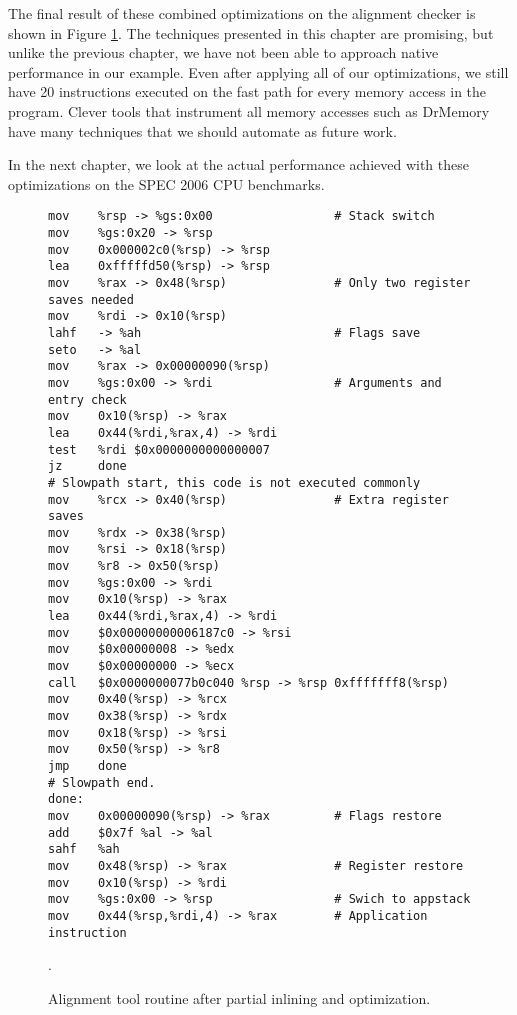 The final result of these combined optimizations on the alignment checker is
shown in Figure \ref{fig:alignment_all_opt}.  The techniques presented in this
chapter are promising, but unlike the previous chapter, we have not been able to
approach native performance in our example.  Even after applying all of our
optimizations, we still have 20 instructions executed on the fast path for every
memory access in the program.  Clever tools that instrument all memory accesses
such as DrMemory have many techniques that we should automate as future work.

In the next chapter, we look at the actual performance achieved with these
optimizations on the SPEC 2006 CPU benchmarks.

\begin{figure}
\begin{verbatim}
mov    %rsp -> %gs:0x00                 # Stack switch
mov    %gs:0x20 -> %rsp
mov    0x000002c0(%rsp) -> %rsp
lea    0xfffffd50(%rsp) -> %rsp
mov    %rax -> 0x48(%rsp)               # Only two register saves needed
mov    %rdi -> 0x10(%rsp)
lahf   -> %ah                           # Flags save
seto   -> %al
mov    %rax -> 0x00000090(%rsp)
mov    %gs:0x00 -> %rdi                 # Arguments and entry check
mov    0x10(%rsp) -> %rax
lea    0x44(%rdi,%rax,4) -> %rdi
test   %rdi $0x0000000000000007
jz     done
# Slowpath start, this code is not executed commonly
mov    %rcx -> 0x40(%rsp)               # Extra register saves
mov    %rdx -> 0x38(%rsp)
mov    %rsi -> 0x18(%rsp)
mov    %r8 -> 0x50(%rsp)
mov    %gs:0x00 -> %rdi
mov    0x10(%rsp) -> %rax
lea    0x44(%rdi,%rax,4) -> %rdi
mov    $0x00000000006187c0 -> %rsi
mov    $0x00000008 -> %edx
mov    $0x00000000 -> %ecx
call   $0x0000000077b0c040 %rsp -> %rsp 0xfffffff8(%rsp)
mov    0x40(%rsp) -> %rcx
mov    0x38(%rsp) -> %rdx
mov    0x18(%rsp) -> %rsi
mov    0x50(%rsp) -> %r8
jmp    done
# Slowpath end.
done:
mov    0x00000090(%rsp) -> %rax         # Flags restore
add    $0x7f %al -> %al
sahf   %ah
mov    0x48(%rsp) -> %rax               # Register restore
mov    0x10(%rsp) -> %rdi
mov    %gs:0x00 -> %rsp                 # Swich to appstack
mov    0x44(%rsp,%rdi,4) -> %rax        # Application instruction
\end{verbatim}
\caption{Alignment tool routine after partial inlining and optimization.}
\label{fig:alignment_all_opt}.
\end{figure}
